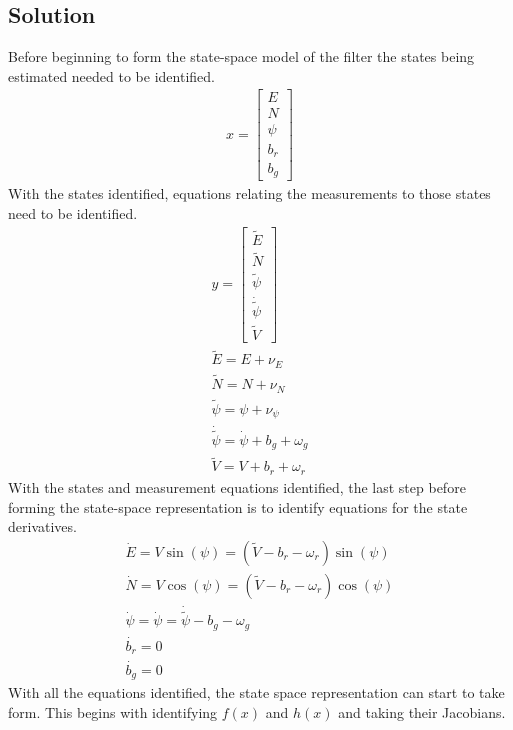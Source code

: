 \documentclass{article}
\begin{document}
\subsection*{Solution}
Before beginning to form the state-space model of the filter the states being estimated needed to be identified.
\begin{gather*}
    x = \begin{bmatrix}
        E \\ N \\ \psi \\ b_r \\ b_g
    \end{bmatrix}
\end{gather*}
With the states identified, equations relating the measurements to those states need to be identified.
\begin{gather*}
    y = \begin{bmatrix}
        \tilde{E} \\ \tilde{N} \\ \tilde{\psi} \\ \dot{\tilde{\psi}} \\ \tilde{V}
    \end{bmatrix} \\
    \tilde{E} = E + \nu_E\\
    \tilde{N} = N + \nu_N\\
    \tilde{\psi} = \psi + \nu_\psi\\
    \dot{\tilde{\psi}} = \dot{\psi} + b_g + \omega_g\\
    \tilde{V} = V + b_r + \omega_r
\end{gather*}
With the states and measurement equations identified, the last step before forming the state-space representation is to identify equations for the state derivatives.
\begin{gather*}
    \dot{E} = V\sin(\psi) = (\tilde{V} - b_r - \omega_r)\sin(\psi)\\
    \dot{N} = V\cos(\psi) = (\tilde{V} - b_r - \omega_r)\cos(\psi)\\
    \dot{\psi} = \dot{\psi} = \dot{\tilde{\psi}} - b_g - \omega_g\\
    \dot{b_r} = 0\\
    \dot{b_g} = 0
\end{gather*}
With all the equations identified, the state space representation can start to take form.  This begins with identifying $f(x)$ and $h(x)$ and taking their Jacobians.
\end{document}
